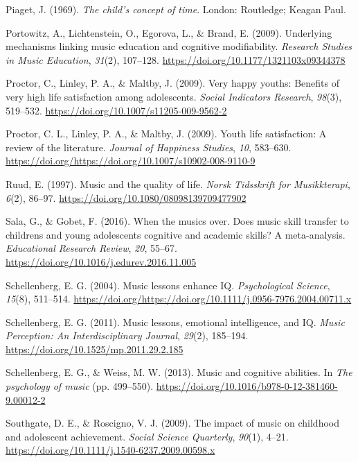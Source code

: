 \documentclass[a4, 12pt]{article}
\begin{document}
\leavevmode\hypertarget{ref-Piaget1969}{}%
Piaget, J. (1969). \emph{The child's concept of time}. London: Routledge; Keagan Paul.

\leavevmode\hypertarget{ref-Portowitz2009}{}%
Portowitz, A., Lichtenstein, O., Egorova, L., \& Brand, E. (2009). Underlying mechanisms linking music education and cognitive modifiability. \emph{Research Studies in Music Education}, \emph{31}(2), 107--128. \url{https://doi.org/10.1177/1321103x09344378}

\leavevmode\hypertarget{ref-Proctor2009a}{}%
Proctor, C., Linley, P. A., \& Maltby, J. (2009). Very happy youths: Benefits of very high life satisfaction among adolescents. \emph{Social Indicators Research}, \emph{98}(3), 519--532. \url{https://doi.org/10.1007/s11205-009-9562-2}

\leavevmode\hypertarget{ref-Proctor2009}{}%
Proctor, C. L., Linley, P. A., \& Maltby, J. (2009). Youth life satisfaction: A review of the literature. \emph{Journal of Happiness Studies}, \emph{10}, 583--630. \url{https://doi.org/https://doi.org/10.1007/s10902-008-9110-9}

\leavevmode\hypertarget{ref-Ruud1997}{}%
Ruud, E. (1997). Music and the quality of life. \emph{Norsk Tidsskrift for Musikkterapi}, \emph{6}(2), 86--97. \url{https://doi.org/10.1080/08098139709477902}

\leavevmode\hypertarget{ref-Sala2016}{}%
Sala, G., \& Gobet, F. (2016). When the musics over. Does music skill transfer to childrens and young adolescents cognitive and academic skills? A meta-analysis. \emph{Educational Research Review}, \emph{20}, 55--67. \url{https://doi.org/10.1016/j.edurev.2016.11.005}

\leavevmode\hypertarget{ref-Schellenberg2004}{}%
Schellenberg, E. G. (2004). Music lessons enhance IQ. \emph{Psychological Science}, \emph{15}(8), 511--514. \url{https://doi.org/https://doi.org/10.1111/j.0956-7976.2004.00711.x}

\leavevmode\hypertarget{ref-Schellenberg2011a}{}%
Schellenberg, E. G. (2011). Music lessons, emotional intelligence, and IQ. \emph{Music Perception: An Interdisciplinary Journal}, \emph{29}(2), 185--194. \url{https://doi.org/10.1525/mp.2011.29.2.185}

\leavevmode\hypertarget{ref-Schellenberg2013}{}%
Schellenberg, E. G., \& Weiss, M. W. (2013). Music and cognitive abilities. In \emph{The psychology of music} (pp. 499--550). \url{https://doi.org/10.1016/b978-0-12-381460-9.00012-2}

\leavevmode\hypertarget{ref-Southgate2009}{}%
Southgate, D. E., \& Roscigno, V. J. (2009). The impact of music on childhood and adolescent achievement. \emph{Social Science Quarterly}, \emph{90}(1), 4--21. \url{https://doi.org/10.1111/j.1540-6237.2009.00598.x}
\end{document}
